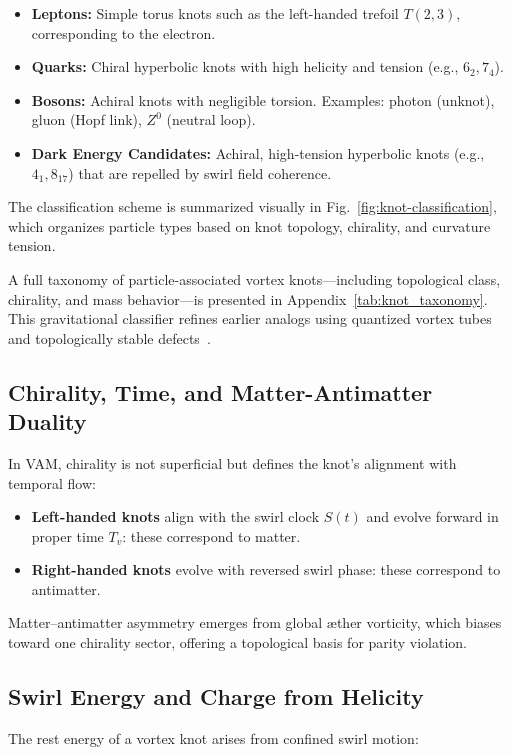 \documentclass[preprint]{revtex4-2}
\begin{document}
    \begin{itemize}
        \item \textbf{Leptons:} Simple torus knots such as the left-handed trefoil \( T(2,3) \), corresponding to the electron.
        \item \textbf{Quarks:} Chiral hyperbolic knots with high helicity and tension (e.g., \( 6_2, 7_4 \)).
        \item \textbf{Bosons:} Achiral knots with negligible torsion. Examples: photon (unknot), gluon (Hopf link), \( Z^0 \) (neutral loop).
        \item \textbf{Dark Energy Candidates:} Achiral, high-tension hyperbolic knots (e.g., \( 4_1, 8_{17} \)) that are repelled by swirl field coherence.
    \end{itemize}

    The classification scheme is summarized visually in Fig.~\ref{fig:knot-classification}, which organizes particle types based on knot topology, chirality, and curvature tension.

    A full taxonomy of particle-associated vortex knots—including topological class, chirality, and mass behavior—is presented in Appendix~\ref{tab:knot_taxonomy}. This gravitational classifier refines earlier analogs using quantized vortex tubes~\cite{volovik2003universe} and topologically stable defects~\cite{ranada1992knots}.

    \subsection{Chirality, Time, and Matter-Antimatter Duality}
    In VAM, chirality is not superficial but defines the knot’s alignment with temporal flow:

    \begin{itemize}
        \item \textbf{Left-handed knots} align with the swirl clock \( S(t) \) and evolve forward in proper time \( T_v \): these correspond to matter.
        \item \textbf{Right-handed knots} evolve with reversed swirl phase: these correspond to antimatter.
    \end{itemize}

    Matter–antimatter asymmetry emerges from global æther vorticity, which biases toward one chirality sector, offering a topological basis for parity violation.

    \subsection{Swirl Energy and Charge from Helicity}
    The rest energy of a vortex knot arises from confined swirl motion:
\end{document}

